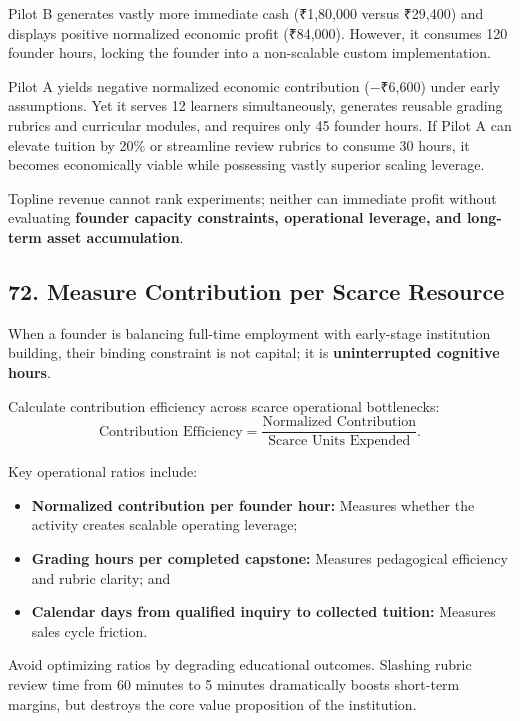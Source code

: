 Pilot B generates vastly more immediate cash (₹1,80,000 versus ₹29,400) and displays positive normalized economic profit (₹84,000). However, it consumes 120 founder hours, locking the founder into a non-scalable custom implementation.

Pilot A yields negative normalized economic contribution (−₹6,600) under early assumptions. Yet it serves 12 learners simultaneously, generates reusable grading rubrics and curricular modules, and requires only 45 founder hours. If Pilot A can elevate tuition by 20\% or streamline review rubrics to consume 30 hours, it becomes economically viable while possessing vastly superior scaling leverage.

Topline revenue cannot rank experiments; neither can immediate profit without evaluating \textbf{founder capacity constraints, operational leverage, and long-term asset accumulation}.

\subsection*{72. Measure Contribution per Scarce Resource}

When a founder is balancing full-time employment with early-stage institution building, their binding constraint is not capital; it is \textbf{uninterrupted cognitive hours}.

Calculate contribution efficiency across scarce operational bottlenecks:
\begin{equation}
\text{Contribution Efficiency} = \frac{\text{Normalized Contribution}}{\text{Scarce Units Expended}}.
\end{equation}

Key operational ratios include:
\begin{itemize}
    \item \textbf{Normalized contribution per founder hour:} Measures whether the activity creates scalable operating leverage;
    \item \textbf{Grading hours per completed capstone:} Measures pedagogical efficiency and rubric clarity; and
    \item \textbf{Calendar days from qualified inquiry to collected tuition:} Measures sales cycle friction.
\end{itemize}

Avoid optimizing ratios by degrading educational outcomes. Slashing rubric review time from 60 minutes to 5 minutes dramatically boosts short-term margins, but destroys the core value proposition of the institution.

